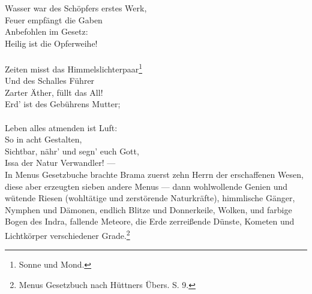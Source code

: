 \documentclass[a4paper, 11pt, oneside, polutonikogreek, german]{article}
\begin{document}
Wasser war des Schöpfers erstes Werk,\\
Feuer empfängt die Gaben\\
Anbefohlen im Gesetz:\\
Heilig ist die Opferweihe!\\
\\
\hspace*{1cm} Zeiten misst das Himmelslichterpaar\footnote{Sonne und Mond.}\\
\hspace*{1cm} Und des Schalles Führer\\
\hspace*{1cm} Zarter Äther, füllt das All!\\
\hspace*{1cm} Erd' ist des Gebührens Mutter;\\
\\
\hspace*{2cm} Leben alles atmenden ist Luft:\\
\hspace*{2cm} So in acht Gestalten,\\
\hspace*{2cm} Sichtbar, nähr' und segn' euch Gott,\\
\hspace*{2cm} Issa der Natur Verwandler! ---\\

In Menus Gesetzbuche brachte Brama zuerst zehn Herrn der erschaffenen Wesen, diese aber erzeugten sieben andere Menus --- dann wohlwollende Genien und wütende Riesen (wohltätige und zerstörende Naturkräfte), himmlische Gänger, Nymphen und Dämonen, endlich Blitze und Donnerkeile, Wolken, und farbige Bogen des Indra, fallende Meteore, die Erde zerreißende Dünste, Kometen und Lichtkörper verschiedener Grade.\footnote{Menus Gesetzbuch nach Hüttners Übers. S. 9.}
\end{document}
